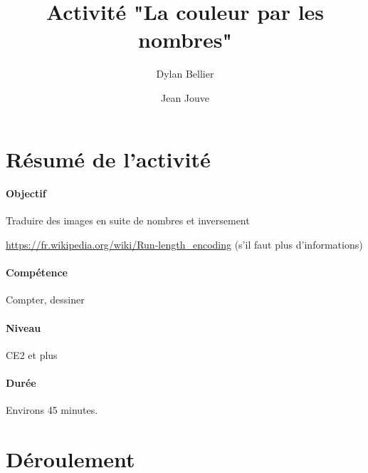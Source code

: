 \documentclass[a4paper,11pt]{article}%
\title{Activité "La couleur par les nombres"}%
\author{Dylan Bellier \and Jean Jouve}%
\date{}%
\begin{document}
%

\maketitle%

\section{Résumé de l'activité}

\paragraph{Objectif}
Traduire des images en suite de nombres et inversement

\url{https://fr.wikipedia.org/wiki/Run-length_encoding} (s'il faut plus 
d'informations)

\paragraph{Compétence}
Compter, dessiner

\paragraph{Niveau}
CE2 et plus


\paragraph{Durée}
Environs 45 minutes.

\section{Déroulement}
\end{document}
